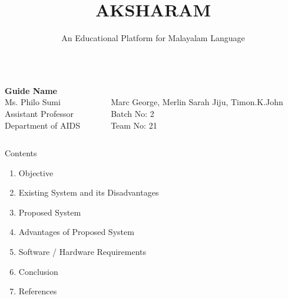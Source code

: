 \documentclass[aspectratio=169]{beamer}
\title{AKSHARAM}
\subtitle{An Educational Platform for Malayalam Language}
\author{}
\date{}
\begin{document}
\begin{frame}
    \vspace{1cm}
    \titlepage
    \subtitle
    \vfill
    \begin{columns}[t]
        \begin{column}{0.5\textwidth}
            \begin{flushleft}
                \textbf{Guide Name} \\ 
                Ms. Philo Sumi \\ 
                Assistant Professor\\
                Department of AIDS
            \end{flushleft}
        \end{column}
        \begin{column}{0.5\textwidth}
            \begin{flushright}
            \\  Marc George, Merlin Sarah Jiju, Timon.K.John \\ {Batch No:} 2 \\ {Team No:} 21
            \end{flushright}
        \end{column}
    \end{columns}
\end{frame}

\begin{frame}{Contents}
    \begin{enumerate}
        \item Objective
        \item Existing System and its Disadvantages
        \item Proposed System
        \item Advantages of Proposed System
        \item Software / Hardware Requirements
        \item Conclusion
        \item References
    \end{enumerate}
\end{frame}
\end{document}
